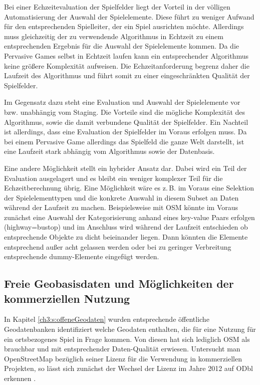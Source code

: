 Bei einer Echzeitevaluation der Spielfelder liegt der Vorteil in der völligen Automatisierung der Auswahl der Spielelemente. Diese führt zu weniger Aufwand für den entsprechenden Spielleiter, der ein Spiel ausrichten möchte. Allerdings muss gleichzeitig der zu verwendende Algorithmus in Echtzeit zu einem entsprechenden Ergebnis für die Auswahl der Spielelemente kommen. Da die Pervasive Games selbst in Echtzeit laufen kann ein entsprechender Algorithmus keine größere Komplexität aufweisen. Die Echzeitanforderung begrenz daher die Laufzeit des Algorithmus und führt somit zu einer eingeschränkten Qualität der Spielfelder.

Im Gegensatz dazu steht eine Evaluation und Auswahl der Spielelemente vor bzw. unabhängig vom Staging. Die Vorteile sind die mögliche Komplexität des Algorithmus, sowie die damit verbundene Qualität der Spielfelder. Ein Nachteil ist allerdings, dass eine Evaluation der Spielfelder im Voraus erfolgen muss. Da bei einem Pervasive Game allerdings das Spielfeld die ganze Welt darstellt, ist eine Laufzeit stark abhängig vom Algorithmus sowie der Datenbasis.

Eine andere Möglichkeit stellt ein hybrider Ansatz dar. Dabei wird ein Teil der Evaluation ausgelagert und es bleibt ein weniger komplexer Teil für die Echzeitberechnung übrig. Eine Möglichkeit wäre es z.\,B. im Voraus eine Selektion der Spielelementtypen und die konkrete Auswahl in diesem Subset an Daten während der Laufzeit zu machen. Beispielsweise mit OSM könnte im Voraus zunächst eine Auswahl der Kategorisierung anhand eines key-value Paars erfolgen (highway=bustop) und im Anschluss wird während der Laufzeit entschieden ob entsprechende Objekte zu dicht beieinander liegen. Dann könnten die Elemente entsprechend außer acht gelassen werden oder bei zu geringer Verbreitung entsprechende dummy-Elemente eingefügt werden.

\subsection*{Freie Geobasisdaten und Möglichkeiten der kommerziellen Nutzung}

In Kapitel \ref{ch3:s:offeneGeodaten} wurden entsprechende öffentliche Geodatenbanken identifiziert welche Geodaten enthalten, die für eine Nutzung für ein ortsbezogenes Spiel in Frage kommen. Von diesen hat sich lediglich OSM als brauchbar und mit entsprechender Daten-Qualität erwiesen. Untersucht man OpenStreetMap bezüglich seiner Lizenz für die Verwendung in kommerziellen Projekten, so lässt sich zunächst der Wechsel der Lizenz im Jahre 2012 auf ODbl erkennen \cite{Ramthun.2012}.

